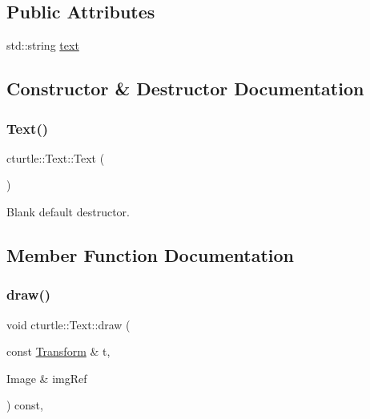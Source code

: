 \subsection*{Public Attributes}
\begin{DoxyCompactItemize}
\item 
std\+::string \hyperlink{classcturtle_1_1Text_ac631d8199ccd9ae56f661e22acc157d9}{text}
\end{DoxyCompactItemize}


\subsection{Constructor \& Destructor Documentation}
\mbox{\label{classcturtle_1_1Text_aad06f49d01be75cbfafedb64a38cfc29}} 
\subsubsection{\texorpdfstring{Text()}{Text()}}
{\footnotesize\ttfamily cturtle\+::\+Text\+::\+Text (\begin{DoxyParamCaption}{ }\end{DoxyParamCaption})\hspace{0.3cm}{\ttfamily [inline]}}

Blank default destructor. 

\subsection{Member Function Documentation}
\mbox{\label{classcturtle_1_1Text_a80003e4c447def1c7de8daf29a8fc5ec}} 
\subsubsection{\texorpdfstring{draw()}{draw()}}
{\footnotesize\ttfamily void cturtle\+::\+Text\+::draw (\begin{DoxyParamCaption}\item[{const \hyperlink{classcturtle_1_1Transform}{Transform} \&}]{t,  }\item[{Image \&}]{img\+Ref }\end{DoxyParamCaption}) const\hspace{0.3cm}{\ttfamily [inline]}, {\ttfamily [virtual]}}



